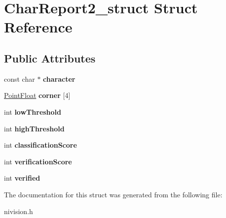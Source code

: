 \hypertarget{structCharReport2__struct}{\section{\-Char\-Report2\-\_\-struct \-Struct \-Reference}
\label{structCharReport2__struct}
}
\subsection*{\-Public \-Attributes}
\begin{DoxyCompactItemize}
\item 
\hypertarget{structCharReport2__struct_ad92251a1d59b63d1e4532e920d0b8b07}{const char $\ast$ {\bfseries character}}\label{structCharReport2__struct_ad92251a1d59b63d1e4532e920d0b8b07}

\item 
\hypertarget{structCharReport2__struct_a2d6cc0eb57ac2b14a5b6105908696654}{\hyperlink{structPointFloat__struct}{\-Point\-Float} {\bfseries corner} \mbox{[}4\mbox{]}}\label{structCharReport2__struct_a2d6cc0eb57ac2b14a5b6105908696654}

\item 
\hypertarget{structCharReport2__struct_a658641bd1fdfec45b009598cc9c6507a}{int {\bfseries low\-Threshold}}\label{structCharReport2__struct_a658641bd1fdfec45b009598cc9c6507a}

\item 
\hypertarget{structCharReport2__struct_afa6d0d23cc46c833df0698991dc733de}{int {\bfseries high\-Threshold}}\label{structCharReport2__struct_afa6d0d23cc46c833df0698991dc733de}

\item 
\hypertarget{structCharReport2__struct_a25182094445b1be411aad8260247cc34}{int {\bfseries classification\-Score}}\label{structCharReport2__struct_a25182094445b1be411aad8260247cc34}

\item 
\hypertarget{structCharReport2__struct_a05a1b0daf3084aec7c92c7278c7496c6}{int {\bfseries verification\-Score}}\label{structCharReport2__struct_a05a1b0daf3084aec7c92c7278c7496c6}

\item 
\hypertarget{structCharReport2__struct_a79b918cfe8c50c0cf05783a1216f1f83}{int {\bfseries verified}}\label{structCharReport2__struct_a79b918cfe8c50c0cf05783a1216f1f83}

\end{DoxyCompactItemize}


\-The documentation for this struct was generated from the following file\-:\begin{DoxyCompactItemize}
\item 
nivision.\-h\end{DoxyCompactItemize}
